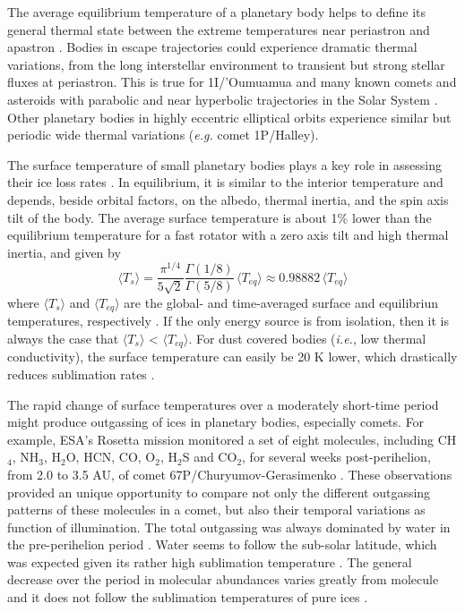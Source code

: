 \documentclass[a4paper,fleqn,usenatbib]{mnras}
\begin{document}
The average equilibrium temperature of a planetary body helps to define its general thermal state between the extreme temperatures near periastron and apastron \citep{2017ApJ...837L...1M}. Bodies in escape trajectories could experience dramatic thermal variations, from the long interstellar environment to transient but strong stellar fluxes at periastron. This is true for 1I/'Oumuamua and many known comets and asteroids with parabolic and near hyperbolic trajectories in the Solar System \citep{SSD(2018)}. Other planetary bodies in highly eccentric elliptical orbits experience similar but periodic wide thermal variations (\emph{e.g.} comet 1P/Halley).

The surface temperature of small planetary bodies plays a key role in assessing their ice loss rates \citep{2018arXiv180201293S}. In equilibrium, it is similar to the interior temperature and depends, beside orbital factors, on the albedo, thermal inertia, and the spin axis tilt of the body. The average surface temperature is about 1\% lower than the equilibrium temperature for a fast rotator with a zero axis tilt and high thermal inertia, and given by
\begin{equation} \label{eq:Ts}
\langle T_s \rangle = \frac{\pi^{1/4}}{5\sqrt{2}} \frac{\Gamma(1/8)}{\Gamma(5/8)} \, \langle T_{eq} \rangle \approx 0.98882 \, \langle T_{eq} \rangle
\end{equation}
where $\langle T_s \rangle$ and $\langle T_{eq} \rangle$ are the global- and time-averaged surface and equilibriun temperatures, respectively \citep{2018arXiv180201293S}. If the only energy source is from isolation, then it is
always the case that $\langle T_s \rangle$ < $\langle T_{eq} \rangle$. For dust covered bodies (\emph{i.e.}, low thermal conductivity), the surface temperature
can easily be 20 K lower, which drastically reduces sublimation rates \citep{2008ApJ...682..697S, 2016Icar..276...88S}.

The rapid change of surface temperatures over a moderately short-time period might produce outgassing of ices in planetary bodies, especially comets. For example, ESA's Rosetta mission monitored a set of eight molecules, including CH$_4$, NH$_3$, H$_2$O, HCN, CO, O$_2$, H$_2$S and CO$_2$, for several weeks post-perihelion, from 2.0 to 3.5 AU, of comet 67P/Churyumov-Gerasimenko \citep{2017MNRAS.469S.108G}. These observations provided an unique opportunity to compare not only the different outgassing patterns of these molecules in a comet, but also their temporal variations as function of illumination. The total outgassing was always dominated by water in the pre-perihelion period \citep{2016MNRAS.462S.156F}. Water seems to follow the sub-solar latitude, which was expected given its rather high sublimation temperature \citep{2016MNRAS.462S.491H}. The general decrease over the period in molecular abundances varies greatly from molecule and it does not follow the sublimation temperatures of pure ices \citep[Table 2 from ][]{2017MNRAS.469S.108G}.
\end{document}
